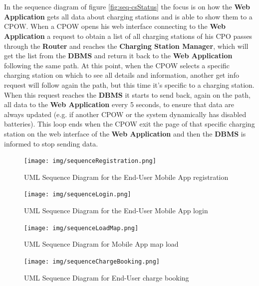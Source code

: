 \documentclass[a4paper]{report}
\begin{document}
\\\\
In the sequence diagram of figure \ref{fig:seq-csStatus} the focus is on how the \textbf{Web Application} gets all data about charging stations and is able to show them to a CPOW. When a CPOW opens his web interface connecting to the \textbf{Web Application} a request to obtain a list of all charging stations of his CPO passes through the \textbf{Router} and reaches the \textbf{Charging Station Manager}, which will get the list from the \textbf{DBMS} and return it back to the \textbf{Web Application} following the same path. At this point, when the CPOW selects a specific charging station on which to see all details and information, another get info request will follow again the path, but this time it's specific to a charging station. When this request reaches the \textbf{DBMS} it starts to send back, again on the path, all data to the  \textbf{Web Application} every 5 seconds, to ensure that data are always updated (e.g. if another CPOW or the system dynamically has disabled batteries). This loop ends when the CPOW exit the page of that specific charging station on the web interface of the \textbf{Web Application} and then the \textbf{DBMS} is informed to stop sending data.

\begin{landscape}
\begin{figure}[hp]
\centering
\texttt{[image: img/sequenceRegistration.png]}
\caption{UML Sequence Diagram for the End-User Mobile App registration}
\label{fig:seq-registration}
\end{figure}
\end{landscape}

\begin{landscape}
\begin{figure}[hp]
\centering
\texttt{[image: img/sequenceLogin.png]}
\caption{UML Sequence Diagram for the End-User Mobile App login}
\label{fig:seq-login}
\end{figure}
\end{landscape}

\begin{landscape}
\begin{figure}[hp]
\centering
\texttt{[image: img/sequenceLoadMap.png]}
\caption{UML Sequence Diagram for Mobile App map load}
\label{fig:seq-loadMap}
\end{figure}
\end{landscape}

\begin{landscape}
\begin{figure}[hp]
\centering
\texttt{[image: img/sequenceChargeBooking.png]}
\caption{UML Sequence Diagram for End-User charge booking}
\label{fig:seq-booking}
\end{figure}
\end{landscape}
\end{document}
